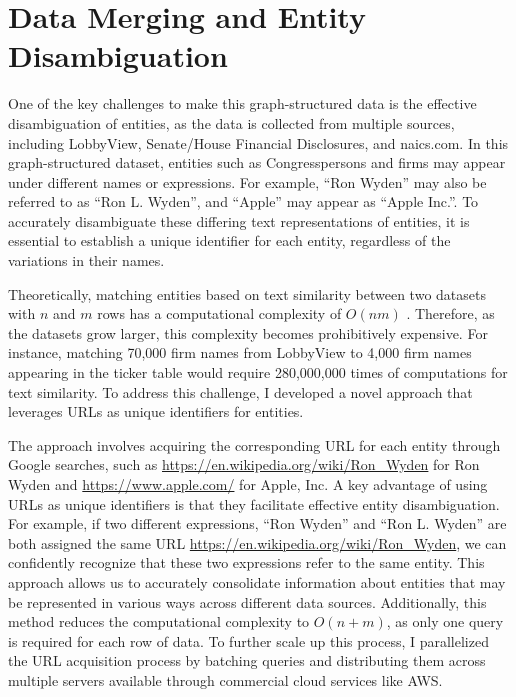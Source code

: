 \documentclass[15pt,letterpaper]{article}
\begin{document}


\appendix
\section{Data Merging and Entity Disambiguation}\label{app:disambiguation}

One of the key challenges to make this graph-structured data is the effective disambiguation of entities, as the data is collected from multiple sources, including LobbyView, Senate/House Financial Disclosures, and naics.com. In this graph-structured dataset, entities such as Congresspersons and firms may appear under different names or expressions. For example, ``Ron Wyden'' may also be referred to as ``Ron L. Wyden'', and ``Apple'' may appear as ``Apple Inc.''. To accurately disambiguate these differing text representations of entities, it is essential to establish a unique identifier for each entity, regardless of the variations in their names.

Theoretically, matching entities based on text similarity between two datasets with $n$ and $m$ rows has a computational complexity of 
$O(n m)$ \citep{onm}. 
Therefore, as the datasets grow larger, this complexity becomes prohibitively expensive. For instance, matching 70,000 firm names from LobbyView to 4,000 firm names appearing in the ticker table would require 280,000,000 times of computations for text similarity. To address this challenge, I developed a novel approach that leverages URLs as unique identifiers for entities.

The approach involves acquiring the corresponding URL for each entity through Google searches, such as \url{https://en.wikipedia.org/wiki/Ron_Wyden} for Ron Wyden and \url{https://www.apple.com/} for Apple, Inc. A key advantage of using URLs as unique identifiers is that they facilitate effective entity disambiguation. For example, if two different expressions, ``Ron Wyden'' and ``Ron L. Wyden'' are both assigned the same URL \url{https://en.wikipedia.org/wiki/Ron_Wyden}, we can confidently recognize that these two expressions refer to the same entity. This approach allows us to accurately consolidate information about entities that may be represented in various ways across different data sources. Additionally, this method reduces the computational complexity to 
$O(n+m)$, as only one query is required for each row of data. To further scale up this process, I parallelized the URL acquisition process by batching queries and distributing them across multiple servers available through commercial cloud services like AWS.
\end{document}
